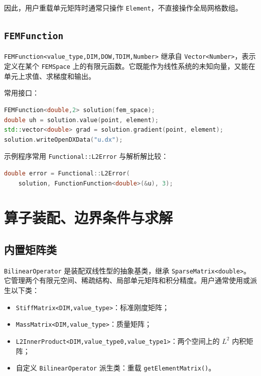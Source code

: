 \documentclass[UTF8,openany,zihao=-4,scheme=chinese]{ctexbook}
\newcommand{\class}[1]{\texttt{#1}}
\begin{document}
因此，用户重载单元矩阵时通常只操作 \class{Element}，不直接操作全局网格数组。

\section{\class{FEMFunction}}

\class{FEMFunction<value\_type,DIM,DOW,TDIM,Number>} 继承自 \class{Vector<Number>}，表示定义在某个 \class{FEMSpace} 上的有限元函数。它既能作为线性系统的未知向量，又能在单元上求值、求梯度和输出。

常用接口：

\begin{lstlisting}[language=C++]
FEMFunction<double,2> solution(fem_space);
double uh = solution.value(point, element);
std::vector<double> grad = solution.gradient(point, element);
solution.writeOpenDXData("u.dx");
\end{lstlisting}

示例程序常用 \class{Functional::L2Error} 与解析解比较：

\begin{lstlisting}[language=C++]
double error = Functional::L2Error(
    solution, FunctionFunction<double>(&u), 3);
\end{lstlisting}

\chapter{算子装配、边界条件与求解}

\section{内置矩阵类}

\class{BilinearOperator} 是装配双线性型的抽象基类，继承 \class{SparseMatrix<double>}。它管理两个有限元空间、稀疏结构、局部单元矩阵和积分精度。用户通常使用或派生以下类：

\begin{itemize}[leftmargin=2em]
  \item \class{StiffMatrix<DIM,value\_type>}：标准刚度矩阵；
  \item \class{MassMatrix<DIM,value\_type>}：质量矩阵；
  \item \class{L2InnerProduct<DIM,value\_type0,value\_type1>}：两个空间上的 $L^2$ 内积矩阵；
  \item 自定义 \class{BilinearOperator} 派生类：重载 \class{getElementMatrix()}。
\end{itemize}
\end{document}
